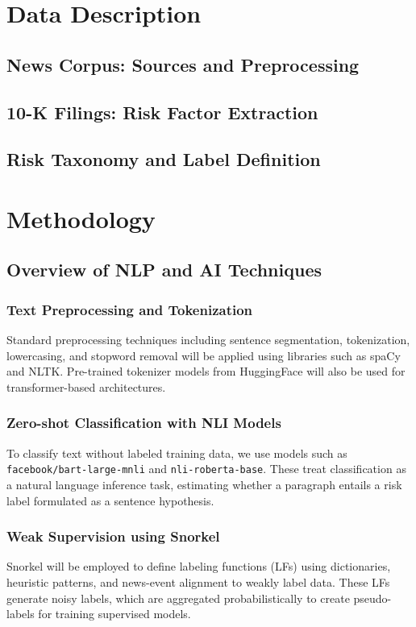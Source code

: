 \documentclass[12pt]{report}
\begin{document}
\chapter{Data Description}
\section{News Corpus: Sources and Preprocessing}
\section{10-K Filings: Risk Factor Extraction}
\section{Risk Taxonomy and Label Definition}

\chapter{Methodology}
\section{Overview of NLP and AI Techniques}
\subsection{Text Preprocessing and Tokenization}
Standard preprocessing techniques including sentence segmentation, tokenization, lowercasing, and stopword removal will be applied using libraries such as spaCy and NLTK. Pre-trained tokenizer models from HuggingFace will also be used for transformer-based architectures.

\subsection{Zero-shot Classification with NLI Models}
To classify text without labeled training data, we use models such as \texttt{facebook/bart-large-mnli} and \texttt{nli-roberta-base}. These treat classification as a natural language inference task, estimating whether a paragraph entails a risk label formulated as a sentence hypothesis.

\subsection{Weak Supervision using Snorkel}
Snorkel will be employed to define labeling functions (LFs) using dictionaries, heuristic patterns, and news-event alignment to weakly label data. These LFs generate noisy labels, which are aggregated probabilistically to create pseudo-labels for training supervised models.
\end{document}
